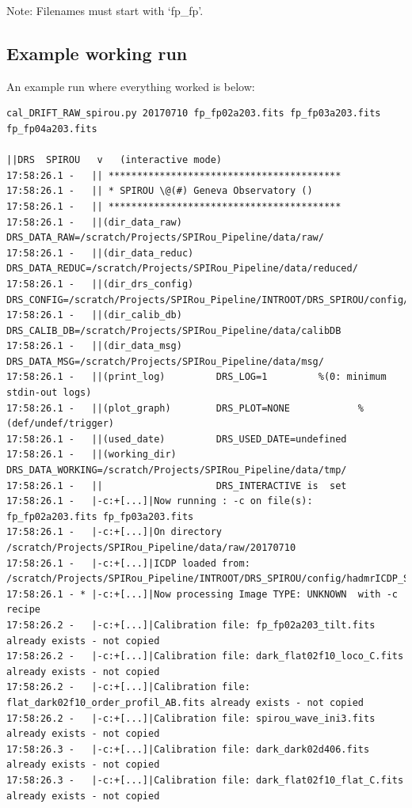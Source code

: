 Note: Filenames must start with `fp\_fp'.

\subsection{Example working run}

An example run where everything worked is below:

\begin{lstlisting}[style=text]
cal_DRIFT_RAW_spirou.py 20170710 fp_fp02a203.fits fp_fp03a203.fits
fp_fp04a203.fits

||DRS  SPIROU   v   (interactive mode)
17:58:26.1 -   || *****************************************
17:58:26.1 -   || * SPIROU \@(#) Geneva Observatory ()
17:58:26.1 -   || *****************************************
17:58:26.1 -   ||(dir_data_raw)      DRS_DATA_RAW=/scratch/Projects/SPIRou_Pipeline/data/raw/
17:58:26.1 -   ||(dir_data_reduc)    DRS_DATA_REDUC=/scratch/Projects/SPIRou_Pipeline/data/reduced/
17:58:26.1 -   ||(dir_drs_config)    DRS_CONFIG=/scratch/Projects/SPIRou_Pipeline/INTROOT/DRS_SPIROU/config/
17:58:26.1 -   ||(dir_calib_db)      DRS_CALIB_DB=/scratch/Projects/SPIRou_Pipeline/data/calibDB
17:58:26.1 -   ||(dir_data_msg)      DRS_DATA_MSG=/scratch/Projects/SPIRou_Pipeline/data/msg/
17:58:26.1 -   ||(print_log)         DRS_LOG=1         %(0: minimum stdin-out logs)
17:58:26.1 -   ||(plot_graph)        DRS_PLOT=NONE            %(def/undef/trigger)
17:58:26.1 -   ||(used_date)         DRS_USED_DATE=undefined
17:58:26.1 -   ||(working_dir)       DRS_DATA_WORKING=/scratch/Projects/SPIRou_Pipeline/data/tmp/
17:58:26.1 -   ||                    DRS_INTERACTIVE is  set
17:58:26.1 -   |-c:+[...]|Now running : -c on file(s):  fp_fp02a203.fits fp_fp03a203.fits
17:58:26.1 -   |-c:+[...]|On directory /scratch/Projects/SPIRou_Pipeline/data/raw/20170710
17:58:26.1 -   |-c:+[...]|ICDP loaded from: /scratch/Projects/SPIRou_Pipeline/INTROOT/DRS_SPIROU/config/hadmrICDP_SPIROU.py
17:58:26.1 - * |-c:+[...]|Now processing Image TYPE: UNKNOWN  with -c recipe
17:58:26.2 -   |-c:+[...]|Calibration file: fp_fp02a203_tilt.fits already exists - not copied
17:58:26.2 -   |-c:+[...]|Calibration file: dark_flat02f10_loco_C.fits already exists - not copied
17:58:26.2 -   |-c:+[...]|Calibration file: flat_dark02f10_order_profil_AB.fits already exists - not copied
17:58:26.2 -   |-c:+[...]|Calibration file: spirou_wave_ini3.fits already exists - not copied
17:58:26.3 -   |-c:+[...]|Calibration file: dark_dark02d406.fits already exists - not copied
17:58:26.3 -   |-c:+[...]|Calibration file: dark_flat02f10_flat_C.fits already exists - not copied

\end{lstlisting}
